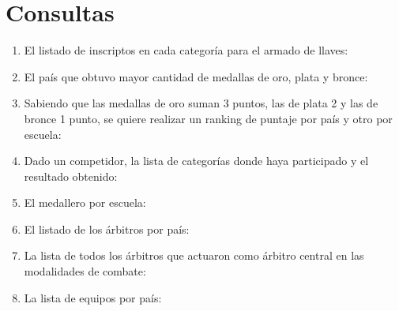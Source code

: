 \newpage
\section{Consultas}

\begin{enumerate}
\item El listado de inscriptos en cada categoría para el armado de llaves:


\item El país que obtuvo mayor cantidad de medallas de oro, plata y bronce:


\item Sabiendo que las medallas de oro suman 3 puntos, las de plata 2 y las de bronce 1 punto, se quiere realizar un ranking de puntaje por país y otro por escuela:


\item Dado un competidor, la lista de categorías donde haya participado y el resultado obtenido:


\item El medallero por escuela:


\item El listado de los árbitros por país:


\item La lista de todos los árbitros que actuaron como árbitro central en las modalidades de combate:


\item La lista de equipos por país:


\end{enumerate}
